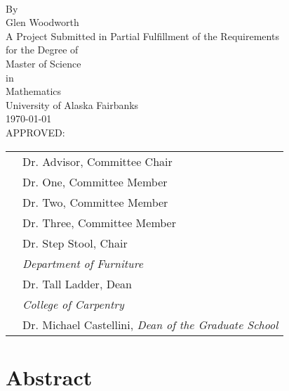 
\begin{titlepage}
\begin{center}
\setcounter{page}{1}
\thesistitle\\
\bigskip 
\bigskip
By\\
Glen Woodworth\\ %
\bigskip
\bigskip
A Project Submitted in Partial Fulfillment of the Requirements\\
for the Degree of\\
Master of Science\\
in\\
Mathematics\\  %
\bigskip
University of Alaska Fairbanks\\
\today \\  %
\bigskip
\bigskip
\bigskip
\bigskip
\bigskip
\bigskip
APPROVED:
\end{center}
\singlespacing
\begin{tabular}{p{7cm} l}  %
\hfill & Dr. Advisor, Committee Chair\\
 & Dr. One, Committee Member\\
 & Dr. Two, Committee Member\\
 & Dr. Three, Committee Member\\
 & Dr. Step Stool, Chair\\                           %
 & \qquad \textit{Department of Furniture}\\    %
 & Dr. Tall Ladder, Dean\\                   %
 & \qquad \textit{College of Carpentry}\\       %
 & Dr. Michael Castellini, \textit{Dean of the Graduate School}
\end{tabular}
\doublespacing
\thispagestyle{empty}
\end{titlepage}

\clearpage\mbox{}\thispagestyle{empty}\clearpage  %


\section*{Abstract}
